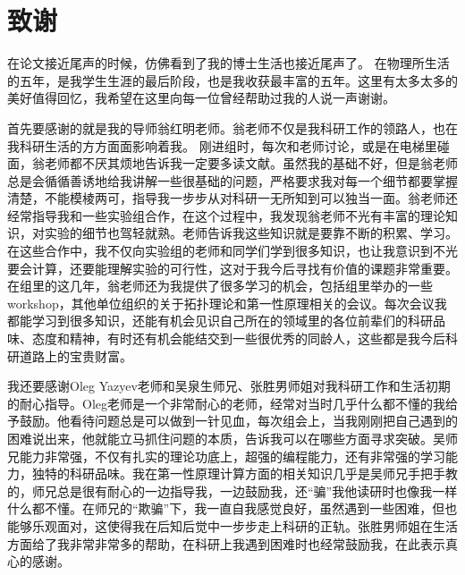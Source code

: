 \chapter[致谢]{致\quad 谢}%
\thispagestyle{noheaderstyle}%

在论文接近尾声的时候，仿佛看到了我的博士生活也接近尾声了。
在物理所生活的五年，是我学生生涯的最后阶段，也是我收获最丰富的五年。这里有太多太多的美好值得回忆，我希望在这里向每一位曾经帮助过我的人说一声谢谢。

首先要感谢的就是我的导师翁红明老师。翁老师不仅是我科研工作的领路人，也在我科研生活的方方面面影响着我。%
刚进组时，每次和老师讨论，或是在电梯里碰面，翁老师都不厌其烦地告诉我一定要多读文献。虽然我的基础不好，但是翁老师总是会循循善诱地给我讲解一些很基础的问题，严格要求我对每一个细节都要掌握清楚，不能模棱两可，指导我一步步从对科研一无所知到可以独当一面。翁老师还经常指导我和一些实验组合作，在这个过程中，我发现翁老师不光有丰富的理论知识，对实验的细节也驾轻就熟。老师告诉我这些知识就是要靠不断的积累、学习。
在这些合作中，我不仅向实验组的老师和同学们学到很多知识，也让我意识到不光要会计算，还要能理解实验的可行性，这对于我今后寻找有价值的课题非常重要。在组里的这几年，翁老师还为我提供了很多学习的机会，包括组里举办的一些workshop，其他单位组织的关于拓扑理论和第一性原理相关的会议。每次会议我都能学习到很多知识，还能有机会见识自己所在的领域里的各位前辈们的科研品味、态度和精神，有时还有机会能结交到一些很优秀的同龄人，这些都是我今后科研道路上的宝贵财富。

我还要感谢‪Oleg Yazyev‬老师和吴泉生师兄、张胜男师姐对我科研工作和生活初期的耐心指导。Oleg老师是一个非常耐心的老师，经常对当时几乎什么都不懂的我给予鼓励。他看待问题总是可以做到一针见血，每次组会上，当我刚刚把自己遇到的困难说出来，他就能立马抓住问题的本质，告诉我可以在哪些方面寻求突破。吴师兄能力非常强，不仅有扎实的理论功底上，超强的编程能力，还有非常强的学习能力，独特的科研品味。我在第一性原理计算方面的相关知识几乎是吴师兄手把手教的，师兄总是很有耐心的一边指导我，一边鼓励我，还“骗”我他读研时也像我一样什么都不懂。在师兄的“欺骗”下，我一直自我感觉良好，虽然遇到一些困难，但也能够乐观面对，这使得我在后知后觉中一步步走上科研的正轨。张胜男师姐在生活方面给了我非常非常多的帮助，在科研上我遇到困难时也经常鼓励我，在此表示真心的感谢。

